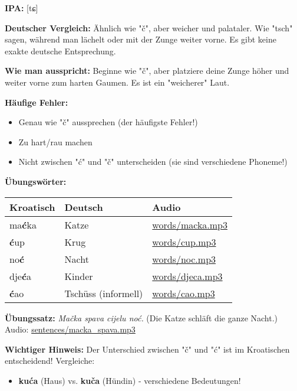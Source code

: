\begin{tcolorbox}[breakable, colback=lightblue!30, colframe=croatianblue, title=\textbf{Ć, ć}]

\textbf{IPA:} [tɕ]

\textbf{Deutscher Vergleich:}
Ähnlich wie "č", aber weicher und palataler. Wie "tsch" sagen, während man lächelt oder mit der Zunge weiter vorne. Es gibt keine exakte deutsche Entsprechung.

\textbf{Wie man ausspricht:}
Beginne wie "č", aber platziere deine Zunge höher und weiter vorne zum harten Gaumen. Es ist ein "weicherer" Laut.

\textbf{Häufige Fehler:}
\begin{itemize}
    \item Genau wie "č" aussprechen (der häufigste Fehler!)
    \item Zu hart/rau machen
    \item Nicht zwischen "ć" und "č" unterscheiden (sie sind verschiedene Phoneme!)
\end{itemize}

\textbf{Übungswörter:}
\begin{center}
\small
\begin{tabular}{lll}
\textbf{Kroatisch} & \textbf{Deutsch} & \textbf{Audio} \\
\midrule
ma\textbf{ć}ka & Katze & \small\url{words/macka.mp3} \\
\textbf{ć}up & Krug & \small\url{words/cup.mp3} \\
no\textbf{ć} & Nacht & \small\url{words/noc.mp3} \\
dje\textbf{ć}a & Kinder & \small\url{words/djeca.mp3} \\
\textbf{ć}ao & Tschüss (informell) & \small\url{words/cao.mp3} \\
\end{tabular}
\end{center}

\textbf{Übungssatz:}
\textit{Mačka spava cijelu noć.}
(Die Katze schläft die ganze Nacht.)
Audio: \small\url{sentences/macka\_spava.mp3}

\textbf{Wichtiger Hinweis:}
Der Unterschied zwischen "č" und "ć" ist im Kroatischen entscheidend! Vergleiche:
\begin{itemize}
    \item \textbf{kuća} (Haus) vs. \textbf{kuča} (Hündin) - verschiedene Bedeutungen!
\end{itemize}

\end{tcolorbox}

